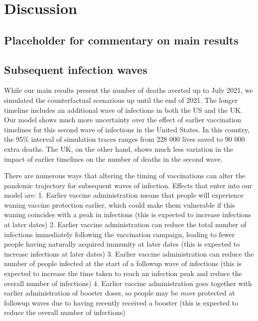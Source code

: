 \documentclass{article}
\begin{document}
\hypertarget{discussion}{%
\section{Discussion}\label{discussion}}

\hypertarget{placeholder-for-commentary-on-main-results}{%
\subsection{Placeholder for commentary on main results}\label{placeholder-for-commentary-on-main-results}}

\hypertarget{subsequent-infection-waves}{%
\subsection{Subsequent infection waves}\label{subsequent-infection-waves}}

While our main results present the number of deaths averted up to July 2021, we simulated the counterfactual scenarious up until the end of 2021. The longer timeline includes an additional wave of infections in both the US and the UK. Our model shows much more uncertainty over the effect of earlier vaccination timelines for this second wave of infections in the United States. In this country, the 95\% interval of simulation traces ranges from 228 000 lives saved to 90 000 extra deaths. The UK, on the other hand, shows much less variation in the impact of earlier timelines on the number of deaths in the second wave.

There are numerous ways that altering the timing of vaccinations can alter the pandemic trajectory for subsequent waves of infection. Effects that enter into our model are:
1. Earlier vaccine administration means that people will experience waning vaccine protection earlier, which could make them vulnerable if this waning coincides with a peak in infections (this is expected to increase infections at later dates)
2. Earlier vaccine administration can reduce the total number of infections immediately following the vaccination campaign, leading to fewer people having naturally acquired immunity at later dates (this is expected to increase infections at later dates)
3. Earlier vaccine administration can reduce the number of people infected at the start of a followup wave of infections (this is expected to increase the time taken to reach an infection peak and reduce the overall number of infections)
4. Earlier vaccine administration goes together with earlier administration of booster doses, so people may be \emph{more} protected at followup waves due to having recently received a booster (this is expected to reduce the overall number of infections)
\end{document}
